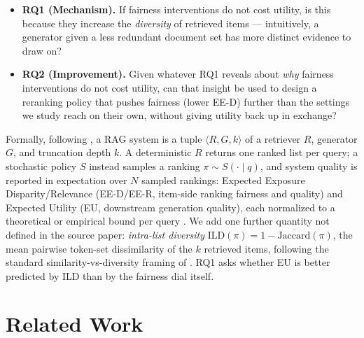 \documentclass[10pt,twocolumn]{article}
\begin{document}
\begin{itemize}[leftmargin=1.1em]
  \item \textbf{RQ1 (Mechanism).} If fairness interventions do not cost utility, is
  this because they increase the \emph{diversity} of retrieved items --- intuitively,
  a generator given a less redundant document set has more distinct evidence to draw
  on?
  \item \textbf{RQ2 (Improvement).} Given whatever RQ1 reveals about \emph{why}
  fairness interventions do not cost utility, can that insight be used to design a
  reranking policy that pushes fairness (lower EE-D) further than the settings we
  study reach on their own, without giving utility back up in exchange?
\end{itemize}

Formally, following \cite{eunkim2025fairrag}, a RAG system is a tuple
$\langle R, G, k \rangle$ of a retriever $R$, generator $G$, and truncation depth
$k$. A deterministic $R$ returns one ranked list per query; a stochastic policy $S$
instead samples a ranking $\pi \sim S(\cdot \mid q)$, and system quality is reported
in expectation over $N$ sampled rankings: Expected Exposure Disparity/Relevance
(EE-D/EE-R, item-side ranking fairness and quality) and Expected Utility (EU,
downstream generation quality), each normalized to a theoretical or empirical bound
per query \cite{diaz2020evaluating,eunkim2025fairrag}. We add one further quantity
not defined in the source paper: \emph{intra-list diversity}
$\mathrm{ILD}(\pi) = 1 - \overline{\mathrm{Jaccard}}(\pi)$, the mean pairwise
token-set dissimilarity of the $k$ retrieved items, following the standard
similarity-vs-diversity framing of \cite{smyth2001similarity}. RQ1 asks whether EU is
better predicted by ILD than by the fairness dial itself.

\section{Related Work}
\label{sec:related}
\end{document}
